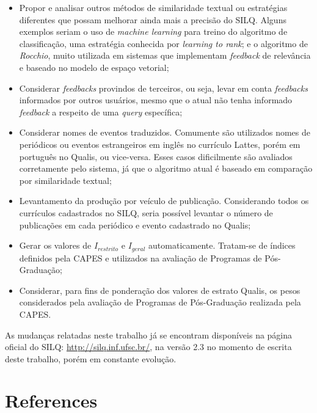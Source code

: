 \documentclass[12pt]{article}
\begin{document}
\begin{itemize}

\item Propor e analisar outros métodos de similaridade textual ou estratégias diferentes que possam melhorar ainda mais a precisão do SILQ. Alguns exemplos seriam o uso de \textit{machine learning} para treino do algoritmo de classificação, uma estratégia conhecida por \textit{learning to rank}; e o algoritmo de \textit{Rocchio}, muito utilizada em sistemas que implementam \textit{feedback} de relevância e baseado no modelo de espaço vetorial;

\item Considerar \textit{feedbacks} provindos de terceiros, ou seja, levar em conta \textit{feedbacks} informados por outros usuários, mesmo que o atual não tenha informado \textit{feedback} a respeito de uma \textit{query} específica;

\item Considerar nomes de eventos traduzidos. Comumente são utilizados nomes de periódicos ou eventos estrangeiros em inglês no currículo Lattes, porém em português no Qualis, ou vice-versa. Esses casos dificilmente são avaliados corretamente pelo sistema, já que o algoritmo atual é baseado em comparação por similaridade textual;

\item Levantamento da produção por veículo de publicação. Considerando todos os currículos cadastrados no SILQ, seria possível levantar o número de publicações em cada periódico e evento cadastrado no Qualis;

\item Gerar os valores de $I_{restrito}$ e $I_{geral}$ automaticamente. Tratam-se de índices definidos pela CAPES e utilizados na avaliação de Programas de Pós-Graduação;

\item Considerar, para fins de ponderação dos valores de estrato Qualis, os pesos considerados pela avaliação de Programas de Pós-Graduação realizada pela CAPES.

\end{itemize}

As mudanças relatadas neste trabalho já se encontram disponíveis na página oficial do SILQ: \url{http://silq.inf.ufsc.br/}, na versão 2.3 no momento de escrita deste trabalho, porém em constante evolução.

\section{References}



\end{document}
